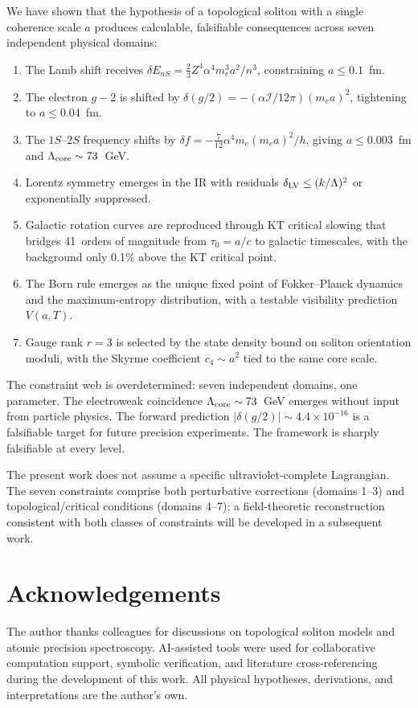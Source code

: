﻿\documentclass[a4paper,12pt]{article}
\begin{document}
We have shown that the hypothesis of a topological soliton with a
single coherence scale $a$ produces calculable, falsifiable consequences
across seven independent physical domains:

\begin{enumerate}
  \item The Lamb shift receives $\delta E_{nS}=\tfrac{2}{3}Z^4\alpha^4m_e^3a^2/n^3$,
    constraining $a\leq 0.1$~fm.
  \item The electron $g{-}2$ is shifted by
    $\delta(g/2)=-(\alpha\mathcal{I}/12\pi)(m_ea)^2$,
    tightening to $a\leq 0.04$~fm.
  \item The $1S$--$2S$ frequency shifts by
    $\delta f=-\tfrac{7}{12}\alpha^4m_e(m_ea)^2/h$,
    giving $a\leq 0.003$~fm and $\Lambda_{\rm core}\sim 73$~GeV.
  \item Lorentz symmetry emerges in the IR with residuals
    $\delta_{\rm LV}\leq(k/\Lambda)^2$ or exponentially suppressed.
  \item Galactic rotation curves are reproduced through KT critical
    slowing that bridges 41~orders of magnitude from $\tau_0=a/c$ to
    galactic timescales, with the background only 0.1\% above the
    KT critical point.
  \item The Born rule emerges as the unique fixed point of
    Fokker--Planck dynamics and the maximum-entropy distribution, with
    a testable visibility prediction $V(a,T)$.
  \item Gauge rank $r=3$ is selected by the state density bound on
    soliton orientation moduli, with the Skyrme coefficient $c_4\sim a^2$
    tied to the same core scale.
\end{enumerate}

The constraint web is overdetermined: seven independent domains,
one parameter.  The electroweak coincidence $\Lambda_{\rm core}\sim 73$~GeV
emerges without input from particle physics.  The forward prediction
$|\delta(g/2)|\sim 4.4\times 10^{-16}$ is a falsifiable target for
future precision experiments.  The framework is sharply falsifiable at every level.

The present work does not assume a specific ultraviolet-complete
Lagrangian.  The seven constraints comprise both perturbative
corrections (domains 1--3) and topological/critical conditions
(domains 4--7); a field-theoretic reconstruction consistent with
both classes of constraints will be developed in a subsequent work.

\section*{Acknowledgements}
The author thanks colleagues for discussions on topological soliton
models and atomic precision spectroscopy.
AI-assisted tools were used for collaborative computation support,
symbolic verification, and literature cross-referencing during
the development of this work.  All physical hypotheses, derivations,
and interpretations are the author's own.
\end{document}
